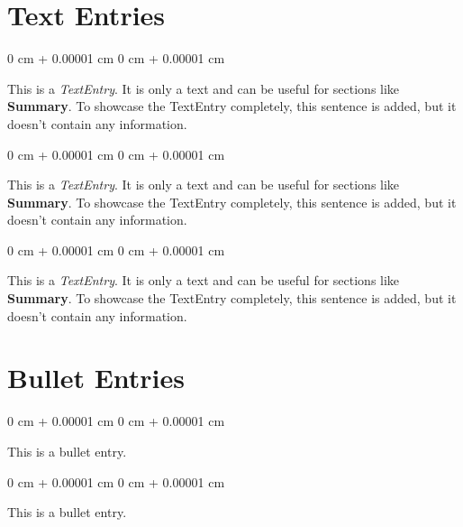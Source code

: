 \documentclass[10pt, letterpaper]{article}
\newenvironment{onecolentry}{
    \begin{adjustwidth}{
        0 cm + 0.00001 cm
    }{
        0 cm + 0.00001 cm
    }
}{
    \end{adjustwidth}
} %
\begin{document}
    \section{Text Entries}

        
        \begin{onecolentry}
            This is a \textit{TextEntry}. It is only a text and can be useful for sections like \textbf{Summary}. To showcase the TextEntry completely, this sentence is added, but it doesn't contain any information.
        \end{onecolentry}

        \vspace{0.1 cm}

        \begin{onecolentry}
            This is a \textit{TextEntry}. It is only a text and can be useful for sections like \textbf{Summary}. To showcase the TextEntry completely, this sentence is added, but it doesn't contain any information.
        \end{onecolentry}

        \vspace{0.1 cm}

        \begin{onecolentry}
            This is a \textit{TextEntry}. It is only a text and can be useful for sections like \textbf{Summary}. To showcase the TextEntry completely, this sentence is added, but it doesn't contain any information.
        \end{onecolentry}


    
    \section{Bullet Entries}

        
        \begin{onecolentry}
            \textbullet \hspace{3pt} This is a bullet entry.
        \end{onecolentry}

        \vspace{0.1 cm}

        \begin{onecolentry}
            \textbullet \hspace{3pt} This is a bullet entry.
        \end{onecolentry}
\end{document}
